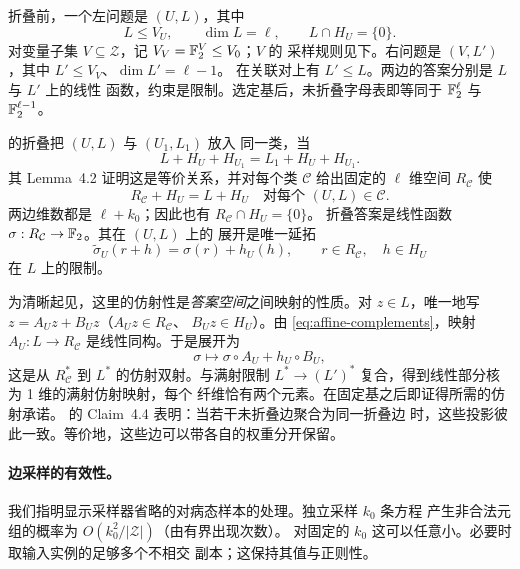 折叠前，一个左问题是 $(U,L)$，其中
\[
  L\leq V_U,\qquad \dim L=\ell,\qquad L\cap H_U=\{0\}.
\]
对变量子集 $V\subseteq\mathcal Z$，记 $V_V=\mathbb F_2^V\le V_0$；$V$ 的
采样规则见下。右问题是 $(V,L')$，其中 $L'\leq V_V$、$\dim L'=\ell-1$。
在关联对上有 $L'\leq L$。两边的答案分别是 $L$ 与 $L'$ 上的线性
函数，约束是限制。选定基后，未折叠字母表即等同于 $\mathbb F_2^\ell$ 与
$\mathbb F_2^{\ell-1}$。

\cite[Section~4.2]{DKKMS25} 的折叠把 $(U,L)$ 与 $(U_1,L_1)$ 放入
同一类，当
\[
 L+H_U+H_{U_1}=L_1+H_U+H_{U_1}.
\]
其 Lemma~4.2 证明这是等价关系，并对每个类 $\mathcal C$ 给出固定的
$\ell$ 维空间 $R_{\mathcal C}$ 使
\begin{equation}
  R_{\mathcal C}+H_U=L+H_U
  \quad\text{对每个 }(U,L)\in\mathcal C.
  \label{eq:affine-complements}
\end{equation}
两边维数都是 $\ell+k_0$；因此也有 $R_{\mathcal C}\cap H_U=\{0\}$。
折叠答案是线性函数 $\sigma:R_{\mathcal C}\to\mathbb F_2$。其在 $(U,L)$ 上的
展开是唯一延拓
\begin{equation}
  \widetilde\sigma_U(r+h)=\sigma(r)+h_U(h),
  \qquad r\in R_{\mathcal C},\quad h\in H_U
  \label{eq:affine-unfolding}
\end{equation}
在 $L$ 上的限制。

为清晰起见，这里的仿射性是\emph{答案空间}之间映射的性质。对
$z\in L$，唯一地写 $z=A_Uz+B_Uz$（$A_Uz\in R_{\mathcal C}$、
$B_Uz\in H_U$）。由 \eqref{eq:affine-complements}，映射
$A_U:L\to R_{\mathcal C}$ 是线性同构。于是展开为
\[
  \sigma\longmapsto\sigma\circ A_U+h_U\circ B_U,
\]
这是从 $R_{\mathcal C}^*$ 到 $L^*$ 的仿射双射。与满射限制
$L^*\to(L')^*$ 复合，得到线性部分核为 1 维的满射仿射映射，每个
纤维恰有两个元素。在固定基之后即证得所需的仿射承诺。
\cite{DKKMS25} 的 Claim~4.4 表明：当若干未折叠边聚合为同一折叠边
时，这些投影彼此一致。等价地，这些边可以带各自的权重分开保留。

\paragraph{边采样的有效性。}
我们指明显示采样器省略的对病态样本的处理。独立采样 $k_0$ 条方程
产生非合法元组的概率为 $O(k_0^2/|\mathcal Z|)$（由有界出现次数）。
对固定的 $k_0$ 这可以任意小。必要时取输入实例的足够多个不相交
副本；这保持其值与正则性。

